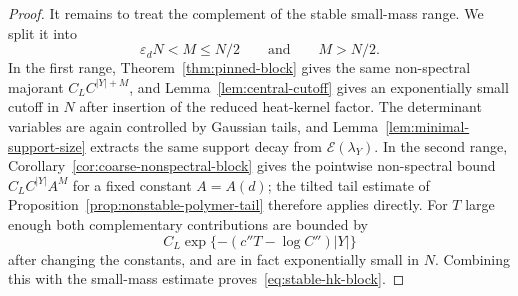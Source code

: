 \documentclass[10pt,a4paper]{amsart}
\begin{document}
\begin{proof}
It remains to treat the complement of the stable small-mass range.  We split it into
\[
\varepsilon_dN<M\le N/2
\qquad\text{and}\qquad
M>N/2.
\]
In the first range, Theorem~\ref{thm:pinned-block} gives the same non-spectral majorant $C_LC^{|Y|+M}$, and Lemma~\ref{lem:central-cutoff} gives an exponentially small cutoff in $N$ after insertion of the reduced heat-kernel factor.  The determinant variables are again controlled by Gaussian tails, and Lemma~\ref{lem:minimal-support-size} extracts the same support decay from $\mathcal E(\lambda_Y)$.  In the second range, Corollary~\ref{cor:coarse-nonspectral-block} gives the pointwise non-spectral bound
$C_LC^{|Y|}A^{M}$ for a fixed constant $A=A(d)$; the tilted tail estimate of Proposition~\ref{prop:nonstable-polymer-tail} therefore applies directly.  For $T$ large enough both complementary contributions are bounded by
\[
C_L\exp\{-(c''T-\log C'')|Y|\}
\]
after changing the constants, and are in fact exponentially small in $N$.  Combining this with the small-mass estimate proves~\eqref{eq:stable-hk-block}.
\end{proof}
\end{document}
